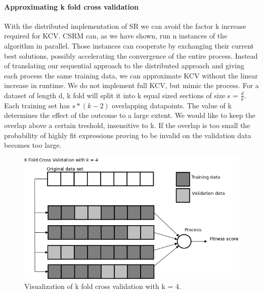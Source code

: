 \paragraph{Approximating k fold cross validation}
With the distributed implementation of SR we can avoid the factor k increase required for KCV. CSRM can, as we have shown, run n instances of the algorithm in parallel. Those instances can cooperate by exchanging their current best solutions, possibly accelerating the convergence of the entire process. Instead of translating our sequential approach to the distributed approach and giving each process the same training data, we can approximate KCV without the linear increase in runtime. We do not implement full KCV, but mimic the process. For a dataset of length d, k fold will split it into k equal sized sections of size s = $\frac{d}{k}$. Each training set has $s*(k-2)$ overlapping datapoints. The value of k determines the effect of the outcome to a large extent. We would like to keep the overlap above a certain treshold, insensitive to k. If the overlap is too small the probability of highly fit expressions proving to be invalid on the validation data becomes too large. 

\begin{figure}
    \centering
    \includegraphics[width=\textwidth,height=\textheight,keepaspectratio]{figures/kfold.png}
    \caption{Visualization of k fold cross validation with k = 4.}
    \label{fig:kfold}
\end{figure}

